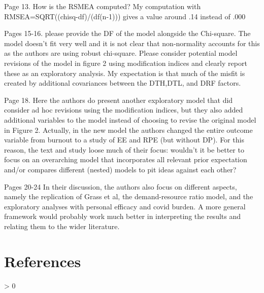 \documentclass[draft]{article}
\newlength{\cslhangindent}
\newenvironment{CSLReferences}[2] %
 {%
  \setlength{\parindent}{0pt}
  \ifodd #1 \everypar{\setlength{\hangindent}{\cslhangindent}}\ignorespaces\fi
  \ifnum #2 > 0
  \setlength{\parskip}{#2\baselineskip}
  \fi
 }%
 {}
\begin{document}
Page 13.
How is the RSMEA computed? My computation with RMSEA=SQRT((chisq-df)/(df(n-1))) gives a value around .14 instead of .000

Pages 15-16.
please provide the DF of the model alongside the Chi-square. The model doesn't fit very well and it is not clear that non-normality accounts for this as the authors are using robust chi-square. Please consider potential model revisions of the model in figure 2 using modification indices and clearly report these as an exploratory analysis. My expectation is that much of the misfit is created by additional covariances between the DTH,DTL, and DRF factors.

Page 18.
Here the authors do present another exploratory model that did consider ad hoc revisions using the modification indices, but they also added additional variables to the model instead of choosing to revise the original model in Figure 2. Actually, in the new model the authors changed the entire outcome variable from burnout to a study of EE and RPE (but without DP). For this reason, the text and study loose much of their focus: wouldn't it be better to focus on an overarching model that incorporates all relevant prior expectation and/or compares different (nested) models to pit ideas against each other?

Pages 20-24
In their discussion, the authors also focus on different aspects, namely the replication of Grass et al, the demand-resource ratio model, and the exploratory analyses with personal efficacy and covid burden. A more general framework would probably work much better in interpreting the results and relating them to the wider literature.

\newpage

\hypertarget{references}{%
\section{References}\label{references}}

\hypertarget{refs}{}
\begin{CSLReferences}{0}{0}
\end{CSLReferences}
\end{document}
